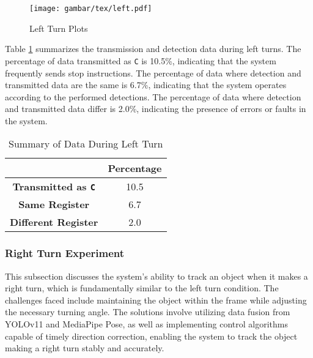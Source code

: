 \begin{figure}[H]
    \centering
    \texttt{[image: gambar/tex/left.pdf]}
    \caption{Left Turn Plots}
    \label{fig:left_turn_plots}
\end{figure}

Table \ref{tab:left_turn_data_transmission_detection} summarizes the transmission and detection data during left turns. The percentage of data transmitted as \texttt{C} is 10.5\%, indicating that the system frequently sends stop instructions. The percentage of data where detection and transmitted data are the same is 6.7\%, indicating that the system operates according to the performed detections. The percentage of data where detection and transmitted data differ is 2.0\%, indicating the presence of errors or faults in the system.

\begin{table}[H]
    \centering
    \caption{Summary of Data During Left Turn}
    \label{tab:left_turn_data_transmission_detection}
    \begin{tabular}{|c|c|}
        \hline 
        \cellcolor[HTML]{000000} & \cellcolor[HTML]{C0C0C0} \textbf{Percentage}  \\ \hline
        \cellcolor[HTML]{C0C0C0} \textbf{Transmitted as \texttt{C}} & 10.5 \\ \hline
        \cellcolor[HTML]{C0C0C0} \textbf{Same Register}  & 6.7 \\ \hline
        \cellcolor[HTML]{C0C0C0} \textbf{Different Register}   & 2.0 \\ \hline
    \end{tabular}
\end{table}

\vspace{5pt}
\subsubsection{Right Turn Experiment}
\label{subsubsec:rightturnexperiment}

This subsection discusses the system's ability to track an object when it makes a right turn, which is fundamentally similar to the left turn condition. The challenges faced include maintaining the object within the frame while adjusting the necessary turning angle. The solutions involve utilizing data fusion from YOLOv11 and MediaPipe Pose, as well as implementing control algorithms capable of timely direction correction, enabling the system to track the object making a right turn stably and accurately.

